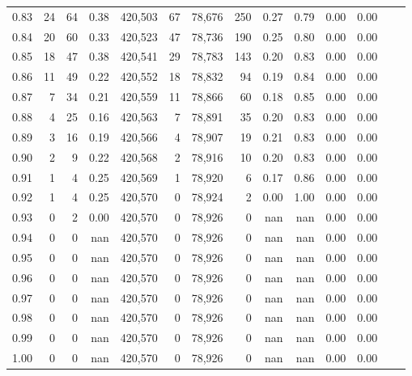 \begin{tabular}{rrrrrrrrrrrrrr}
0.83 &      24 &     64 &    0.38 &  420,503 &       67 &  78,676 &     250 &  0.27 &  0.79 &  0.00 &      0.00 \\
0.84 &      20 &     60 &    0.33 &  420,523 &       47 &  78,736 &     190 &  0.25 &  0.80 &  0.00 &      0.00 \\
0.85 &      18 &     47 &    0.38 &  420,541 &       29 &  78,783 &     143 &  0.20 &  0.83 &  0.00 &      0.00 \\
0.86 &      11 &     49 &    0.22 &  420,552 &       18 &  78,832 &      94 &  0.19 &  0.84 &  0.00 &      0.00 \\
0.87 &       7 &     34 &    0.21 &  420,559 &       11 &  78,866 &      60 &  0.18 &  0.85 &  0.00 &      0.00 \\
0.88 &       4 &     25 &    0.16 &  420,563 &        7 &  78,891 &      35 &  0.20 &  0.83 &  0.00 &      0.00 \\
0.89 &       3 &     16 &    0.19 &  420,566 &        4 &  78,907 &      19 &  0.21 &  0.83 &  0.00 &      0.00 \\
0.90 &       2 &      9 &    0.22 &  420,568 &        2 &  78,916 &      10 &  0.20 &  0.83 &  0.00 &      0.00 \\
0.91 &       1 &      4 &    0.25 &  420,569 &        1 &  78,920 &       6 &  0.17 &  0.86 &  0.00 &      0.00 \\
0.92 &       1 &      4 &    0.25 &  420,570 &        0 &  78,924 &       2 &  0.00 &  1.00 &  0.00 &      0.00 \\
0.93 &       0 &      2 &    0.00 &  420,570 &        0 &  78,926 &       0 &   nan &   nan &  0.00 &      0.00 \\
0.94 &       0 &      0 &     nan &  420,570 &        0 &  78,926 &       0 &   nan &   nan &  0.00 &      0.00 \\
0.95 &       0 &      0 &     nan &  420,570 &        0 &  78,926 &       0 &   nan &   nan &  0.00 &      0.00 \\
0.96 &       0 &      0 &     nan &  420,570 &        0 &  78,926 &       0 &   nan &   nan &  0.00 &      0.00 \\
0.97 &       0 &      0 &     nan &  420,570 &        0 &  78,926 &       0 &   nan &   nan &  0.00 &      0.00 \\
0.98 &       0 &      0 &     nan &  420,570 &        0 &  78,926 &       0 &   nan &   nan &  0.00 &      0.00 \\
0.99 &       0 &      0 &     nan &  420,570 &        0 &  78,926 &       0 &   nan &   nan &  0.00 &      0.00 \\
1.00 &       0 &      0 &     nan &  420,570 &        0 &  78,926 &       0 &   nan &   nan &  0.00 &      0.00 \\
\bottomrule
\end{tabular}
